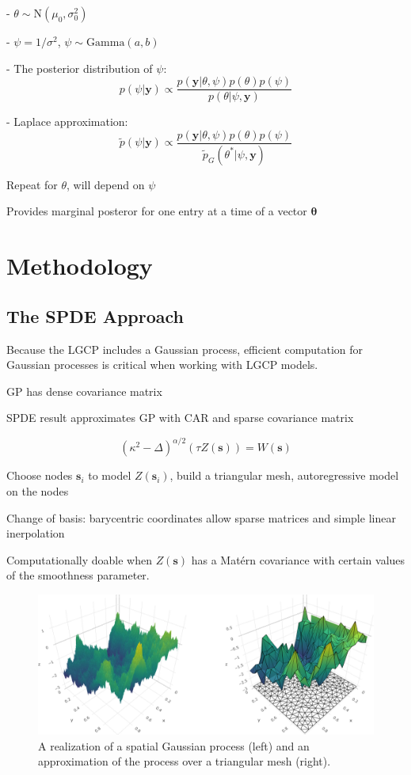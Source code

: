 \documentclass[]{interact}
\begin{document}
- $\theta \sim \mathrm{N}(\mu_{0}, \sigma_{0}^{2})$

- $\psi = 1/\sigma^{2}$, $\psi \sim \mathrm{Gamma}(a, b)$

- The posterior distribution of $\psi$:
$$p(\psi|\mathbf{y}) \propto \frac{p(\mathbf{y} | \theta, \psi) p(\theta) p(\psi)}
{p(\theta | \psi, \mathbf{y})}$$

- Laplace approximation:
$$\tilde{p}(\psi|\mathbf{y}) \propto \frac{p(\mathbf{y} | \theta, \psi) p(\theta) p(\psi)}
{\tilde{p}_{G}(\theta^{*} | \psi, \mathbf{y})}$$

Repeat for $\theta$, will depend on $\psi$

Provides marginal posteror for one entry at a time of a vector $\boldsymbol{\theta}$


\section{Methodology}


\subsection{The SPDE Approach}

Because the LGCP includes a Gaussian process, efficient computation for
Gaussian processes is critical when working with LGCP models.

GP has dense covariance matrix

SPDE result approximates GP with CAR and sparse covariance matrix \cite{lindgrenetal}

$$(\kappa^{2} - \Delta)^{\alpha / 2} (\tau Z(\mathbf{s})) = W(\mathbf{s})$$

Choose nodes $\mathbf{s}_{i}$ to model $Z(\mathbf{s}_{i})$, build a triangular mesh, autoregressive model on the nodes

Change of basis: barycentric coordinates allow sparse matrices and simple linear inerpolation

Computationally doable when \(Z(\mathbf{s})\) has a Mat\'{e}rn covariance with
certain values of the smoothness parameter.

\begin{figure}
\includegraphics[width=\textwidth]{figures/surface.png}
\caption{A realization of a spatial Gaussian process (left) and an
approximation of the process over a triangular mesh (right).}
\label{surface}
\end{figure}
\end{document}
